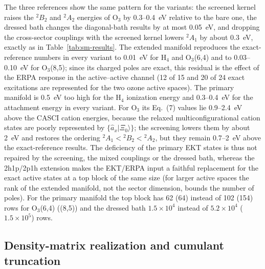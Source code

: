 \documentclass[aip,jcp,reprint,noshowkeys,superscriptaddress]{revtex4-1}
\begin{document}
The three references show the same pattern for the variants: the
screened kernel raises the $^2B_2$ and $^2A_2$ energies of O$_3$ by
0.3--0.4~eV relative to the bare one, the dressed bath changes the
diagonal-bath results by at most 0.05~eV, and dropping the cross-sector
couplings with the screened kernel lowers $^2A_1$ by about 0.3~eV, exactly
as in Table~\ref{tab:sm-results}.  The extended manifold reproduces the
exact-reference numbers in every variant to 0.01~eV for H$_4$ and
O$_3$(6,4) and to 0.03--0.10~eV for O$_3$(8,5); since its charged poles
are exact, this residual is the effect of the ERPA response in the
active--active channel (12 of 15 and 20 of 24 exact excitations are
represented for the two ozone active spaces).  The primary manifold is
0.5~eV too high for the H$_4$ ionization energy and 0.3--0.4~eV for the
attachment energy in every variant.  For O$_3$ its Eq.~(7) values lie
0.9--2.4~eV above the CASCI cation energies, because the relaxed
multiconfigurational cation states are poorly represented by
$\{\hat a_x|\Xi_0\rangle\}$; the screening lowers them by about 2~eV and
restores the ordering $^2A_1<{}^2B_2<{}^2A_2$, but they remain
0.7--2~eV above the exact-reference results.  The deficiency of the
primary EKT states is thus not repaired by the screening, the mixed
couplings or the dressed bath, whereas the 2h1p/2p1h extension makes the
EKT/ERPA input a faithful replacement for the exact active states at a
top block of the same size (for larger active spaces the rank of the
extended manifold, not the sector dimension, bounds the number of poles).
For the primary manifold the top block has 62 (64) instead of 102 (154)
rows for O$_3$(6,4) ((8,5)) and the dressed bath $1.5\times10^{4}$ instead
of $5.2\times10^{4}$ ($1.5\times10^{5}$) rows.


\subsection{Density-matrix realization and cumulant truncation}
\label{sec:ekt-rdm}
\end{document}
